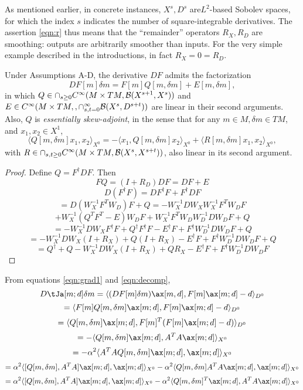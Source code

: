  As mentioned earlier, in concrete instances,
$X^s,D^s$ are$L^2$-based  Sobolev spaces, for
which the index $s$ indicates the number of square-integrable
derivatives. The assertion \ref{eqn:r} thus means that the
``remainder'' operators $R_X,R_D$ are smoothing: outputs are
arbitrarily smoother than inputs. For the very simple example
described in the introductions, in fact $R_X=0=R_D$.

\begin{theorem}
  \label{thm:q} Under Assumptions A-D, 
the derivative $DF$ admits the factorization
\begin{equation}
  \label{eqn:decomp}
  DF[m]\delta m = F[m]Q[m,\delta m] + E[m,\delta m],
\end{equation}
in which $ Q \in \cap_{s \ge 0}C^{\infty}(M \times TM, {\cal
  B}(X^{s+1},X^s))$ and $E \in C^{\infty}(M \times TM, ,\cap_{s,t=0}^{\infty}{\cal B}(X^s,D^{s+t}))$
are linear in their second arguments. Also, $Q$ is {\em essentially skew-adjoint}, in the sense that for any $m \in M,  \delta m \in TM$, and $x_1,x_2 \in X^1$,
\begin{equation}
  \label{eqn:essskew}
  \langle Q[m,\delta m] x_1,x_2 \rangle_{X^0} = -\langle x_1, Q[m,\delta
  m]x_2\rangle_{X^0}
  + \langle R[m,\delta m]x_1,x_2\rangle_{X^0},
\end{equation}
with $R \in \cap_{s,t \ge 0}C^{\infty}(M \times TM, {\cal B}(X^s,X^{s+t}))$,
also linear in its second argument.
\end{theorem}

\begin{proof} Define $Q = F^{\dagger}DF$. Then
  \[
    FQ = (I+R_D)DF = DF + E
  \]
  \[
    D (F^{\dagger}F) = DF^{\dagger}F+F^{\dagger}DF 
  \]
  \[
    = D(W_X^{-1}F^TW_D)F +Q = -W_X^{-1}DW_X W_X^{-1}F^TW_DF
  \]
  \[+
  W_X^{-1}(Q^TF^T-E)W_DF + W_X^{-1}F^TW_D W_D^{-1}DW_DF +Q
\]
\[
=-W_X^{-1}DW_XF^{\dagger}F + Q^{\dagger}F^{\dagger}F - E^{\dagger}F + F^{\dagger}W_D^{-1}DW_DF+Q
\]
\[
  = -W_X^{-1}DW_X(I+R_X) + Q(I+R_X) - E^{\dagger}F +
  F^{\dagger}W_D^{-1}DW_DF+Q
\]
\[
  = Q^{\dagger} + Q -W_X^{-1}DW_X(I+R_X) + QR_X - E^{\dagger}F +
  F^{\dagger}W_D^{-1}DW_DF
  \]
\end{proof}

From equations \ref{eqn:grad1} and \ref{eqn:decomp},
\[
    D\tJa[m;d]\delta m = \langle 
  (DF[m]\delta m)\ax[m,d],F[m]\ax[m;d]-d\rangle_{D^0}
\]
\[
  =\langle F[m]Q[m,\delta m]\ax[m;d],F[m]\ax[m;d]-d\rangle_{D^0}
\]
\[
  = \langle Q[m,\delta m]\ax[m;d],F[m]^T(F[m]\ax[m;d]-d)\rangle_{D^0}
\]
\[
  = -\langle Q[m,\delta m]\ax[m;d],A^TA\ax[m;d]\rangle_{X^0}
\]
\[
  = -\alpha^2\langle A^TA Q[m,\delta m]\ax[m;d],\ax[m;d]\rangle_{X^0}
\]
\[
  =\alpha^2\langle [Q[m,\delta m],A^TA]\ax[m;d],\ax[m;d]\rangle_{X^0} -\alpha^2\langle Q[m,\delta m]A^TA\ax[m;d],\ax[m;d]\rangle_{X^0}
\]
\[
  =\alpha^2\langle [Q[m,\delta m],A^TA]\ax[m;d],\ax[m;d]\rangle_{X^0}-\alpha^2\langle Q[m,\delta m]^T\ax[m;d], A^TA\ax[m;d]\rangle_{X^0}
\]

